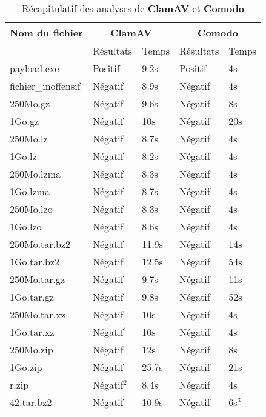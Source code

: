 \documentclass[smallextended]{svjour3}       %
\begin{document}
\begin{table}[ht!]
\begin{normalsize}
\begin{center}
\begin{tabular}{|l|l|l|l|l|}
  \hline
  \textbf{Nom du fichier} & \multicolumn{2}{|c|}{\textbf{ClamAV}} & \multicolumn{2}{|c|}{\textbf{Comodo}}\\
  \hline
   & Résultats & Temps & Résultats & Temps \\
  \hline
  \hline
payload.exe & Positif & 9.2s & Positif & 4s\\
	\hline
fichier\_inoffensif & Négatif & 8.9s & Négatif & 4s\\
	\hline
	\hline
250Mo.gz &  Négatif  & 9.6s & Négatif & 8s\\
	\hline
1Go.gz &  Négatif  & 10s & Négatif & 20s\\
    \hline
    \hline
250Mo.lz &  Négatif  & 8.7s & Négatif & 4s\\
	\hline
1Go.lz &  Négatif & 8.2s & Négatif & 4s\\
    \hline
    \hline
250Mo.lzma &  Négatif  &  8.3s & Négatif & 4s\\
	\hline
1Go.lzma &  Négatif  & 8.7s & Négatif & 4s\\
    \hline
    \hline
250Mo.lzo &   Négatif & 8.3s & Négatif & 4s\\
	\hline
1Go.lzo &  Négatif  & 8.6s & Négatif & 4s\\
    \hline
    \hline
250Mo.tar.bz2 &  Négatif & 11.9s & Négatif & 14s\\
	\hline
1Go.tar.bz2 &  Négatif  &  12.5s & Négatif & 54s\\
    \hline
    \hline
250Mo.tar.gz &   Négatif & 9.7s & Négatif & 11s\\
	\hline
1Go.tar.gz &  Négatif  & 9.8s & Négatif & 52s\\
    \hline
    \hline
250Mo.tar.xz &  Négatif  & 10s & Négatif & 4s\\
	\hline
1Go.tar.xz &  Négatif$^1$  &  10s & Négatif & 4s\\
    \hline
    \hline
250Mo.zip &   Négatif & 12s & Négatif & 8s\\
	\hline
1Go.zip &   Négatif & 25.7s & Négatif & 21s\\
    \hline
    \hline
r.zip & Négatif$^2$ & 8.4s & Négatif & 4s\\
	\hline
42.tar.bz2 & Négatif  & 10.9s & Négatif & 6s$^3$\\
	\hline
\end{tabular}
\end{center}
\caption{Récapitulatif des analyses de \textbf{ClamAV} et \textbf{Comodo}}
\end{normalsize}
\end{table}
\end{document}
